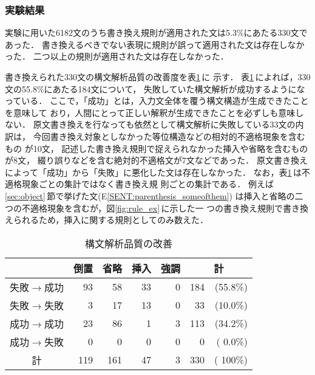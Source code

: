 \subsubsection{実験結果}

実験に用いた6182文のうち書き換え規則が適用された文は5.3\%にあたる330文で
あった．
書き換えるべきでない表現に規則が誤って適用された文は存在しなかった．
二つ以上の規則が適用された文は存在しなかった．

書き換えられた330文の構文解析品質の改善度を表\ref{tab:result_parse}\,に
示す．
表\ref{tab:result_parse}\,によれば，330文の55.8\%にあたる184文について，
失敗していた構文解析が成功するようになっている．
ここで，「成功」とは，入力文全体を覆う構文構造が生成できたことを意味して
おり，人間にとって正しい解釈が生成できたことを必ずしも意味しない．
原文書き換えを行なっても依然として構文解析に失敗している33文の内訳は，
今回書き換え対象としなかった等位構造などの相対的不適格現象を含むもの
が10文，
記述した書き換え規則で捉えられなかった挿入や省略を含むものが8文，
綴り誤りなどを含む絶対的不適格文が7文などであった．
原文書き換えによって「成功」から「失敗」に悪化した文は存在しなかった．
なお，表\ref{tab:result_parse}\,は不適格現象ごとの集計ではなく書き換え規
則ごとの集計である．
例えば\ref{sec:object}\,節で挙げた文(E\ref{SENT:parenthesis_someofthem})
は挿入と省略の二つの不適格現象を含むが，図\ref{fig:rule_ex}\,に示した一
つの書き換え規則で書き換えられるため，挿入に関する規則としてのみ数えた．
\begin{table}[htbp]
\caption{構文解析品質の改善}
\label{tab:result_parse}
\begin{center}
\begin{tabular}{|c||r|r|r|r|r@{}r|}\hline
&\multicolumn{1}{|c|}{倒置}&\multicolumn{1}{|c|}{省略}
&\multicolumn{1}{|c|}{挿入}&\multicolumn{1}{|c|}{強調}
&\multicolumn{2}{|c|}{計}\\\hline\hline
失敗$\rightarrow$成功    &  93 &  58 & 33 & 0 & 184 & (55.8\%) \\
失敗$\rightarrow$失敗    &   3 &  17 & 13 & 0 &  33 & (10.0\%) \\
成功$\rightarrow$成功    &  23 &  86 &  1 & 3 & 113 & (34.2\%) \\
成功$\rightarrow$失敗    &   0 &   0 &  0 & 0 &   0 & ( 0.0\%) \\\hline
\multicolumn{1}{|c||}{計} & 119 & 161 & 47 & 3 & 330 & ( 100\%) \\\hline
\end{tabular}
\end{center}
\end{table}

